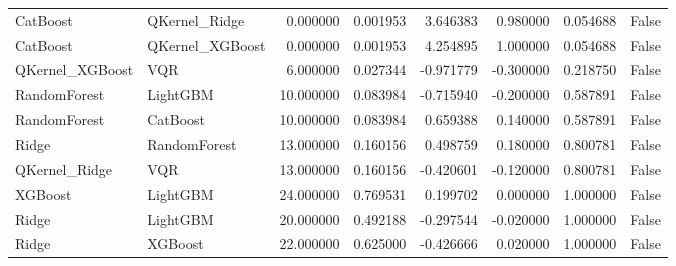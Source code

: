 \begin{table}
\begin{tabular}{llrrrrrr}
CatBoost & QKernel_Ridge & 0.000000 & 0.001953 & 3.646383 & 0.980000 & 0.054688 & False \\
CatBoost & QKernel_XGBoost & 0.000000 & 0.001953 & 4.254895 & 1.000000 & 0.054688 & False \\
QKernel_XGBoost & VQR & 6.000000 & 0.027344 & -0.971779 & -0.300000 & 0.218750 & False \\
RandomForest & LightGBM & 10.000000 & 0.083984 & -0.715940 & -0.200000 & 0.587891 & False \\
RandomForest & CatBoost & 10.000000 & 0.083984 & 0.659388 & 0.140000 & 0.587891 & False \\
Ridge & RandomForest & 13.000000 & 0.160156 & 0.498759 & 0.180000 & 0.800781 & False \\
QKernel_Ridge & VQR & 13.000000 & 0.160156 & -0.420601 & -0.120000 & 0.800781 & False \\
XGBoost & LightGBM & 24.000000 & 0.769531 & 0.199702 & 0.000000 & 1.000000 & False \\
Ridge & LightGBM & 20.000000 & 0.492188 & -0.297544 & -0.020000 & 1.000000 & False \\
Ridge & XGBoost & 22.000000 & 0.625000 & -0.426666 & 0.020000 & 1.000000 & False \\
\bottomrule
\end{tabular}
\end{table}
